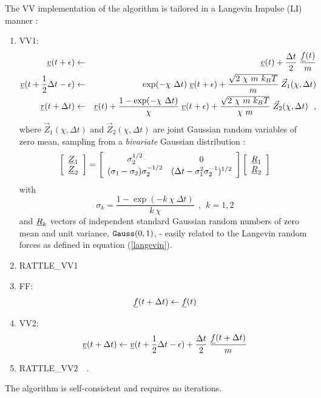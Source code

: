 The VV implementation of the algorithm is tailored in a Langevin
Impulse (LI) manner \cite{izaguirre-01}:
\begin{enumerate}
\item VV1:
\begin{eqnarray}
\mbox{$\underline{v}$}(t + \epsilon) &\leftarrow& \mbox{$\underline{v}$}(t) +
{\Delta t \over 2} \; {\mbox{$\underline{f}$}(t) \over m} \nonumber \\
\mbox{$\underline{v}$}(t + {1 \over 2} \Delta t - \epsilon) &\leftarrow&
\exp(-\chi~\Delta t) \; \mbox{$\underline{v}$}(t + \epsilon) +
\frac{\sqrt{2~\chi~m~k_{B}T}}{m} \; \vec{Z}_{1}(\chi , \Delta t) \\
\mbox{$\underline{r}$}(t + \Delta t) &\leftarrow& \mbox{$\underline{r}$}(t) +
\frac{1-\exp(-\chi~\Delta t)}{\chi} \; \mbox{$\underline{v}$}(t + \epsilon) +
\frac{\sqrt{2~\chi~m~k_{B}T}}{\chi~m} \;
\vec{Z}_{2}(\chi , \Delta t)~~, \nonumber
\end{eqnarray}
where $\vec{Z}_{1}(\chi , \Delta t)$ and $\vec{Z}_{2}(\chi , \Delta
t)$ are joint Gaussian random variables of zero mean, sampling from
a {\em bivariate} Gaussian distribution \cite{izaguirre-01}:
\begin{equation}
\left[
  \begin{array}{c}
    \mbox{$\underline{Z}$}_{1} \\
    \mbox{$\underline{Z}$}_{2} \\
  \end{array}
\right]
=
\left[
  \begin{array}{cc}
    \sigma_{2}^{1/2} & 0 \\
    (\sigma_{1} - \sigma_{2})\sigma_{2}^{-1/2} & (\Delta t - \sigma_{1}^{2}\sigma_{2}^{-1})^{1/2} \\
  \end{array}
\right]
\left[
  \begin{array}{c}
    \mbox{$\underline{R}$}_{1} \\
    \mbox{$\underline{R}$}_{2} \\
  \end{array}
\right]
\end{equation}
with
\begin{equation}
\sigma_{k} = \frac{1 - \exp(-k~\chi~\Delta t)}{k~\chi}~~,~~k=1,2
\end{equation}
and $\mbox{$\underline{R}$}_{k}$ vectors of independent standard Gaussian random
numbers of zero mean and unit variance, ${\tt Gauss}(0,1)$, -
easily related to the Langevin random forces as defined in equation (\ref{langevin}).
\item RATTLE\_VV1
\item FF:
\begin{equation}
\mbox{$\underline{f}$}(t + \Delta t) \leftarrow \mbox{$\underline{f}$}(t)
\end{equation}
\item VV2:
\begin{equation}
\mbox{$\underline{v}$}(t + \Delta t) \leftarrow \mbox{$\underline{v}$}(t + {1 \over 2} \Delta t - \epsilon) +
{\Delta t \over 2} \; {\mbox{$\underline{f}$}(t + \Delta t) \over m}
\end{equation}
\item RATTLE\_VV2~~.
\end{enumerate}
The algorithm is self-consistent and requires no iterations.

